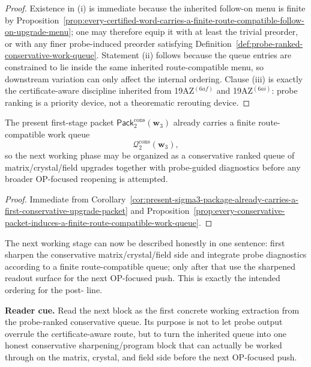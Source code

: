 \begin{proof}
Existence in (i) is immediate because the inherited follow-on menu is finite by Proposition~\ref{prop:every-certified-word-carries-a-finite-route-compatible-follow-on-upgrade-menu}; one may therefore equip it with at least the trivial preorder, or with any finer probe-induced preorder satisfying Definition~\ref{def:probe-ranked-conservative-work-queue}. Statement (ii) follows because the queue entries are constrained to lie inside the same inherited route-compatible menu, so downstream variation can only affect the internal ordering. Clause (iii) is exactly the certificate-aware discipline inherited from 19AZ$^{(6af)}$ and 19AZ$^{(6ai)}$: probe ranking is a priority device, not a theorematic rerouting device.
\end{proof}

\begin{corollary}
\label{cor:first-sigma3-packet-already-carries-a-finite-conservative-work-queue}
The present first-stage packet \(\mathsf{Pack}^{\mathrm{cons}}_{2}(\mathbf w_3)\) already carries a finite route-compatible work queue
\[
 \mathcal Q^{\mathrm{cons}}_{2}(\mathbf w_3),
\]
so the next working phase may be organized as a conservative ranked queue of matrix/crystal/field upgrades together with probe-guided diagnostics before any broader OP-focused reopening is attempted.
\end{corollary}

\begin{proof}
Immediate from Corollary~\ref{cor:present-sigma3-package-already-carries-a-first-conservative-upgrade-packet} and Proposition~\ref{prop:every-conservative-packet-induces-a-finite-route-compatible-work-queue}.
\end{proof}

\begin{remark}
\label{rem:what-this-queue-interface-now-buys}
The next working stage can now be described honestly in one sentence: first sharpen the conservative matrix/crystal/field side and integrate probe diagnostics according to a finite route-compatible queue; only after that use the sharpened readout surface for the next OP-focused push. This is exactly the intended ordering for the post- line.
\end{remark}


\noindent\textbf{Reader cue.} Read the next block as the first concrete working extraction from the probe-ranked conservative queue. Its purpose is not to let probe output overrule the certificate-aware route, but to turn the inherited queue into one honest conservative sharpening/program block that can actually be worked through on the matrix, crystal, and field side before the next OP-focused push.

